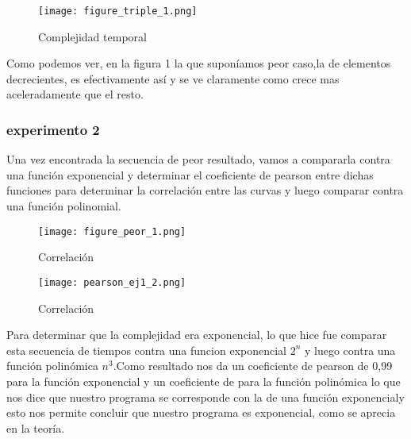 \begin{figure}[h]
    \centering
    \texttt{[image: figure\_triple\_1.png]}
    \caption{Complejidad temporal}
    \label{fig:mesh1}
\end{figure}

Como podemos ver, en la figura 1 la que suponíamos peor caso,la de elementos decrecientes, es efectivamente así y se ve claramente como crece mas aceleradamente que el resto.
\subsubsection {experimento 2}
Una vez encontrada la secuencia de peor resultado, vamos a compararla contra una función exponencial y determinar el coeficiente de pearson entre dichas
funciones para determinar la correlación entre las curvas y luego comparar contra una función polinomial.
\begin{figure}[h]
    \centering
    \texttt{[image: figure\_peor\_1.png]}
    \caption{Correlación}
    \label{fig:mesh1}
\end{figure}

\begin{figure}[h]
    \centering
    \texttt{[image: pearson\_ej1\_2.png]}
    \caption{Correlación}
    \label{fig:mesh1}
\end{figure}
Para determinar que la complejidad era exponencial, lo que hice fue  comparar esta secuencia de tiempos contra una funcion exponencial  $2^n$  y luego contra una función polinómica  $n^3$.Como resultado nos da un coeficiente de pearson de 0,99 para la función
exponencial  y un coeficiente de para la función polinómica lo que nos dice que nuestro programa se corresponde con la de una función exponencialy esto nos permite concluir que nuestro programa es exponencial, como se aprecia en la teoría.

